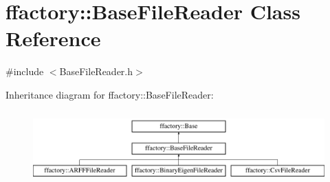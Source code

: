 \hypertarget{classffactory_1_1_base_file_reader}{\section{ffactory\-:\-:Base\-File\-Reader Class Reference}
\label{classffactory_1_1_base_file_reader}
}


{\ttfamily \#include $<$Base\-File\-Reader.\-h$>$}

Inheritance diagram for ffactory\-:\-:Base\-File\-Reader\-:\begin{figure}[H]
\begin{center}
\leavevmode
\includegraphics[height=2.786070cm]{classffactory_1_1_base_file_reader}
\end{center}
\end{figure}
